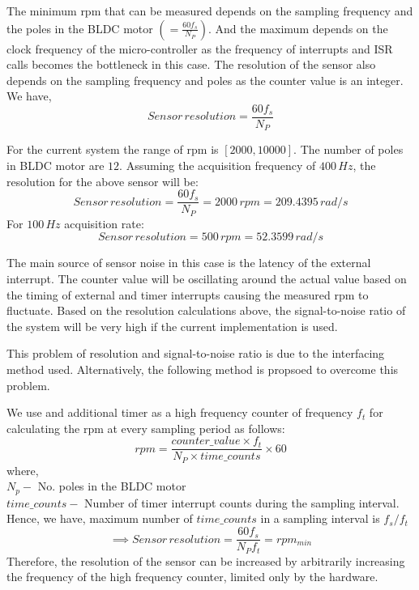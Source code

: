 \par The minimum rpm that can be measured depends on the sampling frequency and the poles in the BLDC motor $(= \frac{60f_s}{N_P} )$. And the maximum depends on the clock frequency of the micro-controller as the frequency of interrupts and ISR calls becomes the bottleneck in this case. The resolution of the sensor also depends on the sampling frequency and poles as the counter value is an integer. We have,
$$Sensor \, resolution = \frac{60f_s}{N_P}$$

\par For the current system the range of rpm is $[2000, 10000]$. The number of poles in BLDC motor are $12$. Assuming the acquisition frequency of $400\,Hz$, the resolution for the above sensor will be:
$$Sensor \, resolution = \frac{60f_s}{N_P} = 2000 \, rpm = 209.4395 \, rad/s$$
For $100 \, Hz$ acquisition rate:
$$Sensor \, resolution = 500 \, rpm = 52.3599 \, rad/s$$

\par The main source of sensor noise in this case is the latency of the external interrupt. The counter value will be oscillating around the actual value based on the timing of external and timer interrupts causing the measured rpm to fluctuate. Based on the resolution calculations above, the signal-to-noise ratio of the system will be very high if the current implementation is used. \\

\par This problem of resolution and signal-to-noise ratio is due to the interfacing method used. Alternatively, the following method is propsoed to overcome this problem.

\bigskip

\par We use and additional timer as a high frequency counter of frequency $f_t$ for calculating the rpm at every sampling period as follows:
$$rpm = \frac{counter\_value \times f_t}{N_P \times time\_counts} \times 60$$
where, \\
$N_p - $ No. poles in the BLDC motor\\
$time\_counts - $ Number of timer interrupt counts during the sampling interval.\\
Hence, we have, maximum number of $time\_counts$ in a sampling interval is $f_s/f_t$\\
$$\implies Sensor \, resolution = \frac{60f_s}{N_P f_t} = rpm_{min}$$
Therefore, the resolution of the sensor can be increased by arbitrarily increasing the frequency of the high frequency counter, limited only by the hardware.\\

